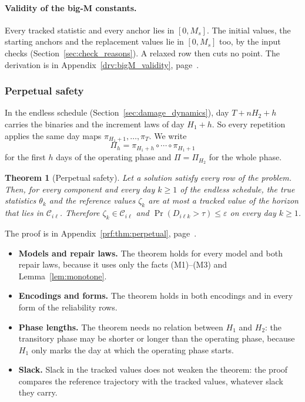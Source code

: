 \documentclass[11pt,a4paper]{article}
\theoremstyle{plain}
\newtheorem{theorem}{Theorem}[section]
\theoremstyle{definition}
\theoremstyle{remark}
\begin{document}
\paragraph{Validity of the big-M constants.}
Every tracked statistic and every anchor lies in $[0, M_s]$.
The initial values, the starting anchors and the replacement values lie in $[0, M_s]$ too, by the input checks (Section~\ref{sec:check_reasons}).
A relaxed row then cuts no point.
The derivation is in Appendix~\ref{drv:bigM_validity}, page~\pageref{drv:bigM_validity}.

\subsubsection{Perpetual safety}
\label{sec:perpetual}

In the endless schedule (Section~\ref{sec:damage_dynamics}), day $T + nH_2 + h$ carries the binaries and the increment laws of day $H_1 + h$.
So every repetition applies the same day maps $\pi_{H_1+1}, \ldots, \pi_T$.
We write
\begin{equation}
  \Pi_h = \pi_{H_1+h} \circ \cdots \circ \pi_{H_1+1}
\end{equation}
for the first $h$ days of the operating phase and $\Pi = \Pi_{H_2}$ for the whole phase.

\begin{theorem}[Perpetual safety]\label{thm:perpetual}
Let a solution satisfy every row of the problem.
Then, for every component and every day $k \ge 1$ of the endless schedule, the true statistics $\theta_k$ and the reference values $\zeta_k$ are at most a tracked value of the horizon that lies in $\mathcal{C}_{i\ell}$.
Therefore $\zeta_k \in \mathcal{C}_{i\ell}$ and $\Pr(D_{i\ell k} > \tau) \le \varepsilon$ on every day $k \ge 1$.
\end{theorem}
The proof is in Appendix~\ref{prf:thm:perpetual}, page~\pageref{prf:thm:perpetual}.

\begin{itemize}
  \item \textbf{Models and repair laws.} The theorem holds for every model and both repair laws, because it uses only the facts (M1)--(M3) and Lemma~\ref{lem:monotone}.
  \item \textbf{Encodings and forms.} The theorem holds in both encodings and in every form of the reliability rows.
  \item \textbf{Phase lengths.} The theorem needs no relation between $H_1$ and $H_2$: the transitory phase may be shorter or longer than the operating phase, because $H_1$ only marks the day at which the operating phase starts.
  \item \textbf{Slack.} Slack in the tracked values does not weaken the theorem: the proof compares the reference trajectory with the tracked values, whatever slack they carry.
\end{itemize}
\end{document}
